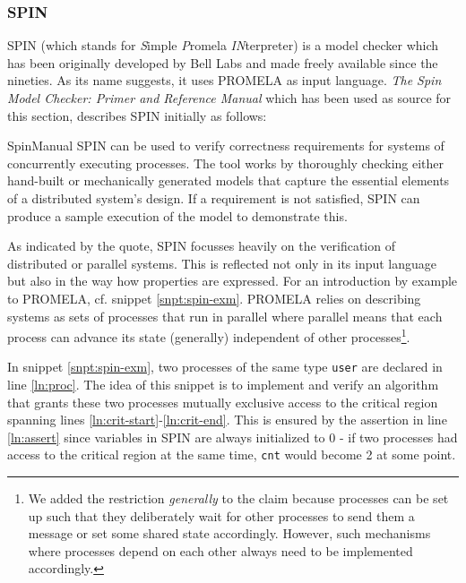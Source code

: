 \subsubsection{SPIN}
\label{sec:spin}

SPIN (which stands for \textit{S}imple \textit{P}romela \textit{IN}terpreter) is a model checker which has been originally developed by Bell Labs and made freely available since the nineties.
As its name suggests, it uses PROMELA as input language.
\textit{The Spin Model Checker: Primer and Reference Manual} which has been used as source for this section, describes SPIN initially as follows:
\begin{displaycquote}[p.1]{SpinManual}
    SPIN can be used to verify correctness requirements for systems of concurrently executing processes.
    The tool works by thoroughly checking either hand-built or mechanically generated models that capture the essential elements of a distributed system's design.
    If a requirement is not satisfied, SPIN can produce a sample execution of the model to demonstrate this.
\end{displaycquote}

As indicated by the quote, SPIN focusses heavily on the verification of distributed or parallel systems.
This is reflected not only in its input language but also in the way how properties are expressed.
For an introduction by example to PROMELA, cf. snippet \ref{snpt:spin-exm}.
PROMELA relies on describing systems as sets of processes that run in parallel where parallel means that each process can advance its state (generally) independent of other processes\footnote{%
    We added the restriction \textit{generally} to the claim because processes can be set up such that they deliberately wait for other processes to send them a message or set some shared state accordingly.
    However, such mechanisms where processes depend on each other always need to be implemented accordingly.
}.

In snippet \ref{snpt:spin-exm}, two processes of the same type \lstinline{user} are declared in line \ref{ln:proc}.
The idea of this snippet is to implement and verify an algorithm that grants these two processes mutually exclusive access to the critical region spanning lines \ref{ln:crit-start}-\ref{ln:crit-end}.
This is ensured by the assertion in line \ref{ln:assert} since variables in SPIN are always initialized to 0 - if two processes had access to the critical region at the same time, \lstinline{cnt} would become 2 at some point.


